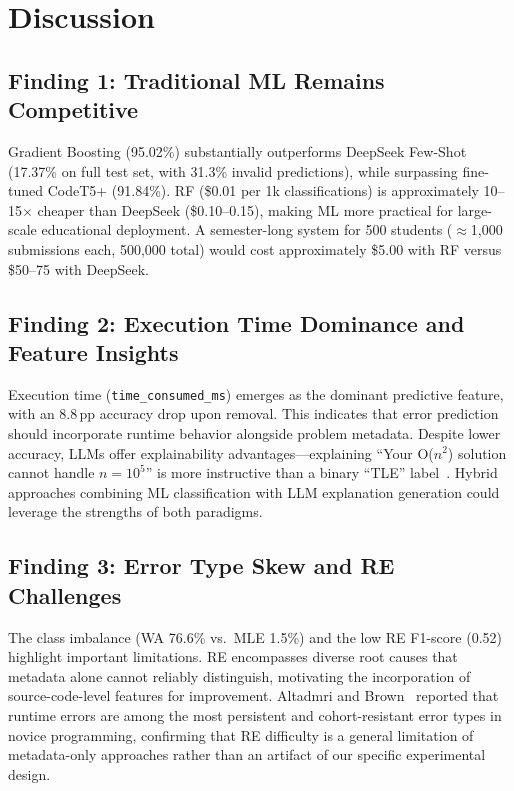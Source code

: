 \documentclass[10pt,a4paper]{article}
\begin{document}
\section{Discussion}

\subsection{Finding 1: Traditional ML Remains Competitive}

Gradient Boosting (95.02\%) substantially outperforms DeepSeek Few-Shot
(17.37\% on full test set, with 31.3\% invalid predictions), while surpassing
fine-tuned CodeT5+ (91.84\%). RF (\$0.01 per 1k classifications) is
approximately 10--15$\times$ cheaper than DeepSeek (\$0.10--0.15), making ML
more practical for large-scale educational deployment. A semester-long system
for 500 students ($\approx$1,000 submissions each, 500,000 total) would cost approximately \$5.00 with RF versus \$50--75
with DeepSeek.

\subsection{Finding 2: Execution Time Dominance and Feature Insights}

Execution time (\texttt{time\_consumed\_ms}) emerges as the dominant
predictive feature, with an 8.8\,pp accuracy drop upon removal. This indicates
that error prediction should incorporate runtime behavior alongside problem
metadata. Despite lower accuracy, LLMs offer explainability
advantages---explaining ``Your O($n^2$) solution cannot handle $n = 10^5$'' is
more instructive than a binary ``TLE'' label~\cite{finnie2022robots}. Hybrid
approaches combining ML classification with LLM explanation generation could
leverage the strengths of both paradigms.

\subsection{Finding 3: Error Type Skew and RE Challenges}

The class imbalance (WA 76.6\% vs.\ MLE 1.5\%) and the low RE F1-score (0.52)
highlight important limitations. RE encompasses diverse root causes that
metadata alone cannot reliably distinguish, motivating the incorporation of
source-code-level features for improvement. Altadmri and Brown~\cite{altadmri2015most} reported that runtime errors are
among the most persistent and cohort-resistant error types in novice
programming, confirming that RE difficulty is a general limitation of
metadata-only approaches rather than an artifact of our specific
experimental design.
\end{document}
